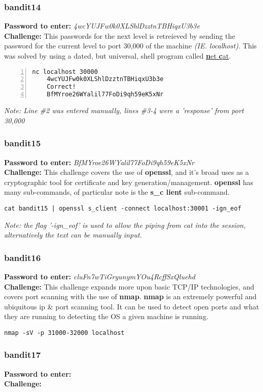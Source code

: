 \documentclass[a4paper]{article}
\newcommand{\pass}[1]{\textbf{Password to enter:} \textit{#1}\\}
\newcommand{\chall}{\textbf{Challenge:} }
\begin{document}
\subsubsection{bandit14}
\pass{4wcYUJFw0k0XLShlDzztnTBHiqxU3b3e}
\chall This passwords for the next level is retreieved by sending the password for the current level to port 30,000 of the machine \textit{(IE. localhost)}. This was solved by using a dated, but universal, shell program called \href{https://en.wikipedia.org/wiki/Netcat}{\textbf{n}et \textbf{c}at}.
\begin{lstlisting}[numbers=left]
nc localhost 30000
	4wcYUJFw0k0XLShlDzztnTBHiqxU3b3e
	Correct!
	BfMYroe26WYalil77FoDi9qh59eK5xNr
\end{lstlisting}
\textit{Note: Line \#2 was entered manually, lines \#3-4 were a 'response' from port 30,000}

\subsubsection{bandit15}
\pass{BfMYroe26WYalil77FoDi9qh59eK5xNr}
\chall This challenge covers the use of \textbf{openssl}, and it's broad uses as a cryptographic tool for certificate and key generation/management. \textbf{openssl} has many sub-commands, of particular note is the \textbf{s\_c lient} sub-command.
\begin{lstlisting}
cat bandit15 | openssl s_client -connect localhost:30001 -ign_eof
\end{lstlisting}
\textit{Note: the flag '-ign\_eof' is used to allow the piping from cat into the session, alternatively the text can be manually input.}

\subsubsection{bandit16}
\pass{cluFn7wTiGryunymYOu4RcffSxQluehd}
\chall This challenge expands more upon basic TCP/IP technologies, and covers port scanning with the use of \textbf{nmap}. \textbf{nmap} is an extremely powerful and ubiquitous ip \& port scanning tool. It can be used to detect open ports and what they are running to detecting the OS a given machine is running.\begin{lstlisting}[title=scan ports 31000 32000 of localhost and attempt to discover what they are running]
nmap -sV -p 31000-32000 localhost
\end{lstlisting}

\subsubsection{bandit17}
\pass{ }
\chall 
\end{document}

